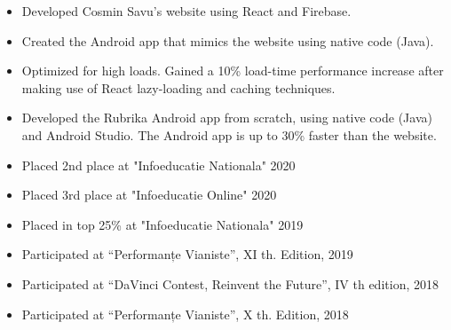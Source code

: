 \documentclass[10pt,a4paper,ragged2e]{resume}
\begin{document}

    \begin{fullwidth}
        \makecvheader
    \end{fullwidth}



    \begin{itemize}
        \item Developed Cosmin Savu's website using React and Firebase.
        \smallskip
        \item Created the Android app that mimics the website using native code (Java).
        \item Optimized for high loads. Gained a 10\% load-time performance increase after making use of React lazy-loading and caching techniques.
        \smallskip
    \end{itemize}

    \divider

    \begin{itemize}
        \item Developed the Rubrika Android app from scratch, using native code (Java) and Android Studio. The Android app is up to 30\% faster than the website.
        \smallskip
    \end{itemize}


    \smallskip
    \begin{itemize}
        \item Placed 2nd place at "Infoeducatie Nationala" 2020
        \item Placed 3rd place at "Infoeducatie Online" 2020
        \item Placed in top 25\% at "Infoeducatie Nationala" 2019
        \item Participated at \textquotedblleft Performanțe Vianiste\textquotedblright, XI th. Edition, 2019
        \item Participated at \textquotedblleft DaVinci Contest, Reinvent the Future\textquotedblright, IV th edition, 2018
        \item Participated at \textquotedblleft Performanțe Vianiste\textquotedblright, X th. Edition, 2018
    \end{itemize}
\end{document}
